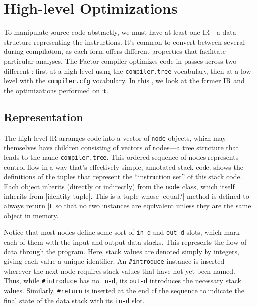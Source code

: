 \section{High-level Optimizations}\label{sec:compiler:tree}

To manipulate source code abstractly, we must have at least one \gls{IR}---a
data structure representing the instructions.  It's common to convert between
several  during compilation, as each form offers different
properties that facilitate particular analyses.  The Factor compiler optimizes
code in passes across two different : first at a high-level using
the \Verb|compiler.tree| vocabulary, then at a low-level with the
\Verb|compiler.cfg| vocabulary.  In this , we
look at the former \gls{IR} and the optimizations performed on it.

\subsection{Representation}

\begin{sloppypar}
The high-level \gls{IR} arranges code into a vector of \Verb|node| objects,
which may themselves have children consisting of vectors of nodes---a tree
structure that lends to the name \Verb|compiler.tree|.  This ordered sequence
of nodes represents control flow in a way that's effectively simple, annotated
stack code.   shows the definitions of the tuples that represent
the ``instruction set'' of this stack code.  Each object inherits (directly or
indirectly) from the \Verb|node| class, which itself inherits from
\factor|identity-tuple|.  This is a tuple whose \factor|equal?| method is
defined to always return \factor|f| so that no two instances are equivalent
unless they are the same object in memory.
\end{sloppypar}


Notice that most nodes define some sort of \Verb|in-d| and \Verb|out-d|
slots, which mark each of them with the input and output data stacks.  This
represents the flow of data through the program.  Here, stack values are
denoted simply by integers, giving each value a unique identifier.  An
\Verb|#introduce| instance is inserted wherever the next node requires stack
values that have not yet been named.  Thus, while \Verb|#introduce| has no
\Verb|in-d|, its \Verb|out-d| introduces the necessary stack values.
Similarly, \Verb|#return| is inserted at the end of the sequence to indicate
the final state of the data stack with its \Verb|in-d| slot.

